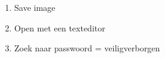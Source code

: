 \begin{enumerate}
  \item Save image
  \item Open met een texteditor
  \item Zoek naar passwoord = veiligverborgen
\end{enumerate}
